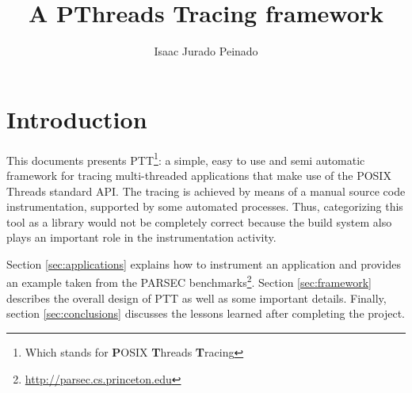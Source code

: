 \documentclass[a4paper,11pt,pdftex]{article}
\title{A PThreads Tracing framework}
\author{Isaac Jurado Peinado}
\renewcommand{\url}[1]{\href{#1}{#1}}
\begin{document}
\maketitle
\tableofcontents
\listoffigures
{}

\setlength{\parskip}{.7\baselineskip plus .2\baselineskip minus .1\baselineskip}
\newpage

\section{Introduction}

This documents presents PTT\footnote{Which stands for \textbf{P}OSIX
\textbf{T}hreads \textbf{T}racing}: a simple, easy to use and semi automatic
framework for tracing multi-threaded applications that make use of the POSIX
Threads standard API.  The tracing is achieved by means of a manual source code
instrumentation, supported by some automated processes.  Thus, categorizing this
tool as a library would not be completely correct because the build system also
plays an important role in the instrumentation activity.

Section \ref{sec:applications} explains how to instrument an application and
provides an example taken from the PARSEC
benchmarks\footnote{\url{http://parsec.cs.princeton.edu}}.  Section
\ref{sec:framework} describes the overall design of PTT as well as some
important details.  Finally, section \ref{sec:conclusions} discusses the lessons
learned after completing the project.




\end{document}

